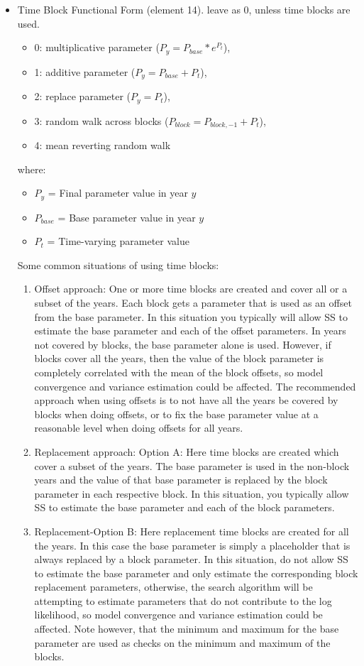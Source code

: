 {\begin{itemize}
\item Time Block Functional Form (element 14). leave as 0, unless time blocks are used.
	\begin{itemize}
		\item 0: multiplicative parameter ($P_{y} = P_{base}*e^{P_t}$),
		\item 1: additive parameter ($P_{y} = P_{base} + P_t$),
		\item 2: replace parameter ($P_{y} = P_t$),
		\item 3: random walk across blocks ($P_{block} = P_{block,-1} + P_t$),
		\item 4: mean reverting random walk
	\end{itemize}
	where:
	\begin{itemize}
        \item $P_{y}$ = Final parameter value in year $y$
        \item $P_{base}$ = Base parameter value in year $y$
		\item $P_{t}$ = Time-varying parameter value
     \end{itemize}
	 Some common situations of using time blocks: 
	 \begin{enumerate}
	\item Offset approach: One or more time blocks are created and cover all or a subset of the years.  Each block gets a parameter that is used as an offset from the base parameter.  In this situation you typically will allow SS to estimate the base parameter and each of the offset parameters.  In years not covered by blocks, the base parameter alone is used.  However, if blocks cover all the years, then the value of the block parameter is completely correlated with the mean of the block offsets, so model convergence and variance estimation could be affected.  The recommended approach when using offsets is to not have all the years be covered by blocks when doing offsets, or to fix the base parameter value at a reasonable level when doing offsets for all years.	
	\item Replacement approach: Option A: Here time blocks are created which cover a subset of the years.  The base parameter is used in the non-block years and the value of that base parameter is replaced by the block parameter in each respective block.  In this situation, you typically allow SS to estimate the base parameter and each of the block parameters.	
	\item Replacement-Option B: Here replacement time blocks are created for all the years.  In this case the base parameter is simply a placeholder that is always replaced by a block parameter. In this situation, do not allow SS to estimate the base parameter and only estimate the corresponding block replacement parameters, otherwise, the search algorithm will be attempting to estimate parameters that do not contribute to the log likelihood, so model convergence and variance estimation could be affected.  Note however, that the minimum and maximum for the base parameter are used as checks on the minimum and maximum of the blocks.
    \end{enumerate}
\end{itemize}


}

